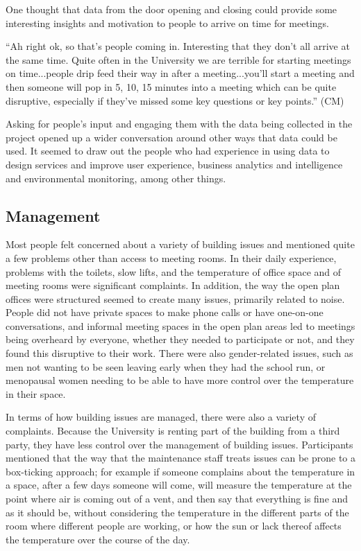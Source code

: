 One thought that data from the door opening and closing could provide some interesting insights and motivation to people to arrive on time for meetings.

“Ah right ok, so that’s people coming in. Interesting that they don’t all arrive at the same time. Quite often in the University we are terrible for starting meetings on time...people drip feed their way in after a meeting...you’ll start a meeting and then someone will pop in 5, 10, 15 minutes into a meeting which can be quite disruptive, especially if they’ve missed some key questions or key points.” (CM)

Asking for people’s input and engaging them with the data being collected in the project opened up a wider conversation around other ways that data could be used. It seemed to draw out the people who had experience in using data to design services and improve user experience, business analytics and intelligence and environmental monitoring, among other things.


\subsection{Management}
\label{sec:management}

Most people felt concerned about a variety of building issues and
mentioned quite a few problems other than access to meeting rooms. In
their daily experience, problems with the toilets, slow lifts, and the
temperature of office space and of meeting rooms were significant
complaints. In addition, the way the open plan offices were structured
seemed to create many issues, primarily related to noise. People did
not have private spaces to make phone calls or have one-on-one
conversations, and informal meeting spaces in the open plan areas led
to meetings being overheard by everyone, whether they needed to
participate or not, and they found this disruptive to their
work. There were also gender-related issues, such as men not wanting
to be seen leaving early when they had the school run, or menopausal
women needing to be able to have more control over the temperature in
their space.  

In terms of how building issues are managed, there were also a variety
of complaints. Because the University is renting part of the building
from a third party, they have less control over the management of
building issues. Participants mentioned that the way that the
maintenance staff treats issues can be prone to a box-ticking
approach; for example if someone complains about the temperature in a
space, after a few days someone will come, will measure the
temperature at the point where air is coming out of a vent, and then
say that everything is fine and as it should be, without considering
the temperature in the different parts of the room where different
people are working, or how the sun or lack thereof affects the
temperature over the course of the day.

